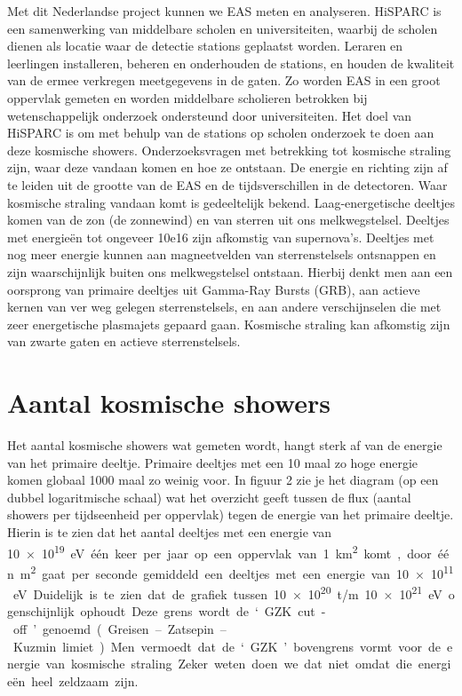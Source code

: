\Section{\hisparc}

Met dit Nederlandse project kunnen we EAS meten en analyseren. HiSPARC
is een samenwerking van middelbare scholen en universiteiten, waarbij de
scholen dienen als locatie waar de detectie stations geplaatst worden.
Leraren en leerlingen installeren, beheren en onderhouden de stations,
en houden de kwaliteit van de ermee verkregen meetgegevens in de gaten.
Zo worden EAS in een groot oppervlak gemeten en worden middelbare
scholieren betrokken bij wetenschappelijk onderzoek ondersteund door
universiteiten. Het doel van HiSPARC is om met behulp van de stations op
scholen onderzoek te doen aan deze kosmische showers. Onderzoeksvragen
met betrekking tot kosmische straling zijn, waar deze vandaan komen en
hoe ze ontstaan. De energie en richting zijn af te leiden uit de grootte
van de EAS en de tijdsverschillen in de detectoren. Waar kosmische
straling vandaan komt is gedeeltelijk bekend. Laag-energetische deeltjes
komen van de zon (de zonnewind) en van sterren uit ons melkwegstelsel.
Deeltjes met energieën tot ongeveer \si{10e16} \electronvolt zijn
afkomstig van supernova's. Deeltjes met nog meer energie kunnen aan
magneetvelden van sterrenstelsels ontsnappen en zijn waarschijnlijk
buiten ons melkwegstelsel ontstaan. Hierbij denkt men aan een oorsprong
van primaire deeltjes uit Gamma-Ray Bursts (GRB), aan actieve kernen van
ver weg gelegen sterrenstelsels, en aan andere verschijnselen die met
zeer energetische plasmajets gepaard gaan. Kosmische straling kan
afkomstig zijn van zwarte gaten en actieve sterrenstelsels.

\section{Aantal kosmische showers}

Het aantal kosmische showers wat gemeten wordt, hangt sterk af van de
energie van het primaire deeltje. Primaire deeltjes met een 10 maal zo
hoge energie komen globaal 1000 maal zo weinig voor. In figuur 2 zie je
het diagram (op een dubbel logaritmische schaal) wat het overzicht geeft
tussen de flux (aantal showers per tijdseenheid per oppervlak) tegen de
energie van het primaire deeltje. Hierin is te zien dat het aantal
deeltjes met een energie van \SI{10e19} \electronvolt één keer per jaar
op een oppervlak van 1 \square\kilo\metre komt, door één \square\metre
gaat per seconde gemiddeld een deeltjes met een energie van \SI{10e11}
\electronvolt. Duidelijk is te zien dat de grafiek tussen \SI{10e20} t/m
\SI{10e21} \electronvolt ogenschijnlijk ophoudt. Deze grens wordt de
‘GZK cut-off’ genoemd. (Greisen–Zatsepin–Kuzmin limiet). Men vermoedt
dat de ‘GZK’ bovengrens vormt voor de energie van kosmische straling.
Zeker weten doen we dat niet omdat die energieën heel zeldzaam zijn.

